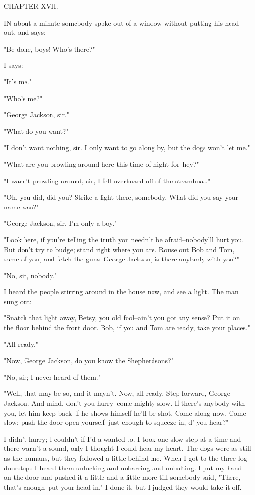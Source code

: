 CHAPTER XVII.

IN about a minute somebody spoke out of a window without putting his head
out, and says:

"Be done, boys!  Who's there?"

I says:

"It's me."

"Who's me?"

"George Jackson, sir."

"What do you want?"

"I don't want nothing, sir.  I only want to go along by, but the dogs
won't let me."

"What are you prowling around here this time of night for--hey?"

"I warn't prowling around, sir, I fell overboard off of the steamboat."

"Oh, you did, did you?  Strike a light there, somebody.  What did you say
your name was?"

"George Jackson, sir.  I'm only a boy."

"Look here, if you're telling the truth you needn't be afraid--nobody'll
hurt you.  But don't try to budge; stand right where you are.  Rouse out
Bob and Tom, some of you, and fetch the guns.  George Jackson, is there
anybody with you?"

"No, sir, nobody."

I heard the people stirring around in the house now, and see a light.
The man sung out:

"Snatch that light away, Betsy, you old fool--ain't you got any sense?
Put it on the floor behind the front door.  Bob, if you and Tom are
ready, take your places."

"All ready."

"Now, George Jackson, do you know the Shepherdsons?"

"No, sir; I never heard of them."

"Well, that may be so, and it mayn't.  Now, all ready.  Step forward,
George Jackson.  And mind, don't you hurry--come mighty slow.  If there's
anybody with you, let him keep back--if he shows himself he'll be shot.
Come along now.  Come slow; push the door open yourself--just enough to
squeeze in, d' you hear?"

I didn't hurry; I couldn't if I'd a wanted to.  I took one slow step at a
time and there warn't a sound, only I thought I could hear my heart.  The
dogs were as still as the humans, but they followed a little behind me.
When I got to the three log doorsteps I heard them unlocking and
unbarring and unbolting.  I put my hand on the door and pushed it a
little and a little more till somebody said, "There, that's enough--put
your head in." I done it, but I judged they would take it off.

